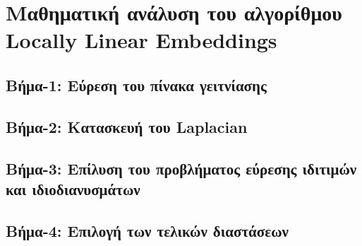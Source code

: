 

\chapter{Μαθηματική ανάλυση του αλγορίθμου \textlatin{Locally Linear Embeddings}}

\section{Βήμα-1: Εύρεση του πίνακα γειτνίασης}

\section{Βήμα-2: Κατασκευή του \textlatin{Laplacian}}

\section{Βήμα-3: Επίλυση του προβλήματος εύρεσης ιδιτιμών και ιδιοδιανυσμάτων}

\section{Βήμα-4: Επιλογή των τελικών διαστάσεων}

